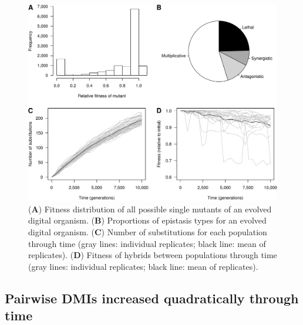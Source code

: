 \begin{doublespace}
\begin{figure}[p]
\begin{center}
\includegraphics[width=5in]{avida.pdf}
\end{center}
\caption{
  (\textbf{A}) Fitness distribution of all possible single mutants
    of an evolved digital organism.
  (\textbf{B}) Proportions of epistasis types for an evolved digital organism.
  (\textbf{C}) Number of substitutions for each population through time
    (gray lines: individual replicates; black line: mean of replicates).
  (\textbf{D}) Fitness of hybrids between populations through time
    (gray lines: individual replicates; black line: mean of replicates).}
\label{avida}
\end{figure}



\subsection{Pairwise DMIs increased quadratically through time}


\end{doublespace}
